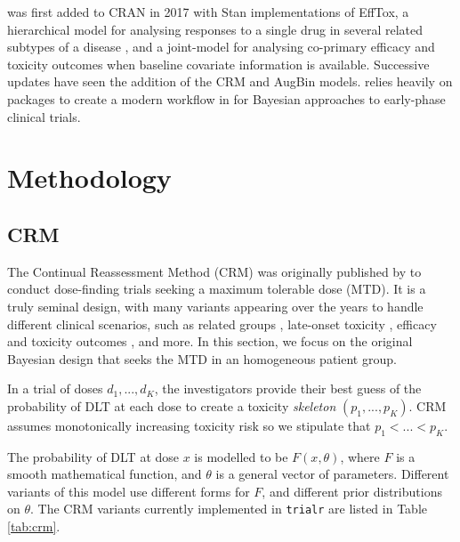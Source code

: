 \documentclass[article]{jss}
\begin{document}
 was first added to CRAN in 2017 with Stan implementations
of EffTox, a hierarchical model for analysing responses to a single drug
in several related subtypes of a disease \citet{Thall2003}, and a
joint-model for analysing co-primary efficacy and toxicity outcomes when
baseline covariate information is available. Successive updates have
seen the addition of the CRM and AugBin models.  relies
heavily on  \citep{tidyverse} packages to create a modern
workflow in  for Bayesian approaches to early-phase clinical
trials.

\newpage

\hypertarget{methodology}{%
\section{Methodology}\label{methodology}}

\hypertarget{crm}{%
\subsection{CRM}\label{crm}}

The Continual Reassessment Method (CRM) was originally published by
\cite{OQuigley1990} to conduct dose-finding trials seeking a maximum
tolerable dose (MTD). It is a truly seminal design, with many variants
appearing over the years to handle different clinical scenarios, such as
related groups \citep{oquigleyContinualReassessmentMethod2003},
late-onset toxicity \citep{Cheung2000}, efficacy and toxicity outcomes
\citep{Braun2002, Zhang2006}, and more. In this section, we focus on the
original Bayesian design that seeks the MTD in an homogeneous patient
group.

In a trial of doses \(d_1, ..., d_K\), the investigators provide their
best guess of the probability of DLT at each dose to create a toxicity
\textit{skeleton} \((p_1, ..., p_K)\). CRM assumes monotonically
increasing toxicity risk so we stipulate that \(p_1 < ... < p_K\).

The probability of DLT at dose \(x\) is modelled to be \(F(x, \theta)\),
where \(F\) is a smooth mathematical function, and \(\theta\) is a
general vector of parameters. Different variants of this model use
different forms for \(F\), and different prior distributions on
\(\theta\). The CRM variants currently implemented in \texttt{trialr}
are listed in Table \ref{tab:crm}.
\end{document}
